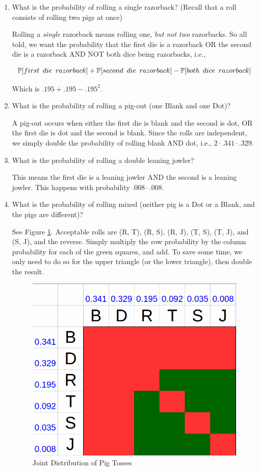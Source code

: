 \documentclass{article}
\newenvironment{solution}{\color{red}}{\color{black}}
\begin{document}
\begin{enumerate}
\item What is the probability of rolling a single razorback? (Recall that a roll consists of rolling two pigs at once)

\begin{solution}
Rolling a \textit{single} razorback means rolling one, \textit{but not two} razorbacks. So all told, we want the probability that the first die is a razorback OR the second die is a razorback AND NOT both dice being razorbacks, i.e.,

\[ \mathbb{P}[first\enskip die\enskip razorback] + \mathbb{P}[second\enskip die\enskip razorback] - \mathbb{P}[both\enskip dice\enskip razorback]\]

Which is $.195 + .195 - .195^2$.
\end{solution}

\item What is the probability of rolling a pig-out (one Blank and one Dot)?

\begin{solution}
A pig-out occurs when either the first die is blank and the second is dot, OR the first die is dot and the second is blank. Since the rolls are independent, we simply double the probability of rolling blank AND dot, i.e., $2\cdot .341\cdot .329$.
\end{solution}

\item What is the probability of rolling a double leaning jowler?

\begin{solution}
This means the first die is a leaning jowler AND the second is a leaning jowler. This happens with probability $.008\cdot .008$.
\end{solution}

\item What is the probability of rolling mixed (neither pig is a Dot or a Blank, and the pigs are different)?

\begin{solution}
See Figure \ref{fig:pigs}. Acceptable rolls are (R, T), (R, S), (R, J), (T, S), (T, J), and (S, J), and the reverse. Simply multiply the row probability by the column probability for each of the green squares, and add. To save some time, we only need to do so for the upper triangle (or the lower triangle), then double the result.

\begin{figure}[htbp]
\centering
\caption{Joint Distribution of Pig Tosses}
\label{fig:pigs}
\includegraphics[width = .5\textwidth]{recitation160901_fig3.png}
\end{figure}


\end{solution}
\end{enumerate}
\end{document}
